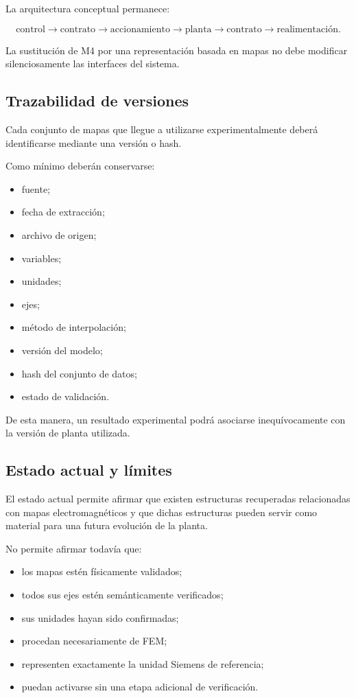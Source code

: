 La arquitectura conceptual permanece:

\begin{equation}
\text{control}
\rightarrow
\text{contrato}
\rightarrow
\text{accionamiento}
\rightarrow
\text{planta}
\rightarrow
\text{contrato}
\rightarrow
\text{realimentación}.
\end{equation}

La sustitución de M4 por una representación basada en mapas no debe modificar silenciosamente las interfaces del sistema.

\subsection{Trazabilidad de versiones}

Cada conjunto de mapas que llegue a utilizarse experimentalmente deberá identificarse mediante una versión o hash.

Como mínimo deberán conservarse:

\begin{itemize}
\item fuente;
\item fecha de extracción;
\item archivo de origen;
\item variables;
\item unidades;
\item ejes;
\item método de interpolación;
\item versión del modelo;
\item hash del conjunto de datos;
\item estado de validación.
\end{itemize}

De esta manera, un resultado experimental podrá asociarse inequívocamente con la versión de planta utilizada.

\subsection{Estado actual y límites}

El estado actual permite afirmar que existen estructuras recuperadas relacionadas con mapas electromagnéticos y que dichas estructuras pueden servir como material para una futura evolución de la planta.

No permite afirmar todavía que:

\begin{itemize}
\item los mapas estén físicamente validados;
\item todos sus ejes estén semánticamente verificados;
\item sus unidades hayan sido confirmadas;
\item procedan necesariamente de FEM;
\item representen exactamente la unidad Siemens de referencia;
\item puedan activarse sin una etapa adicional de verificación.
\end{itemize}

